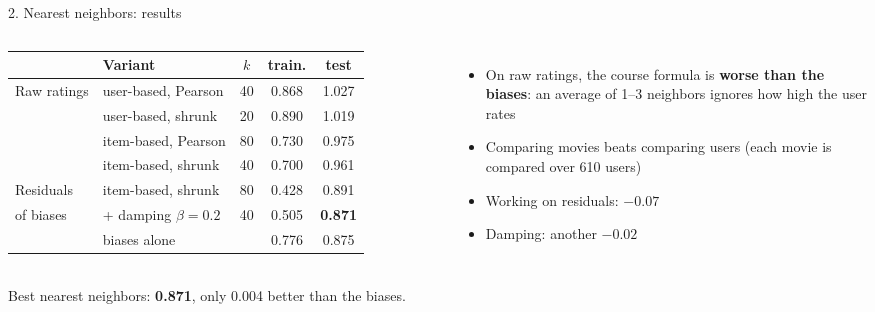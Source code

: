 \documentclass[aspectratio=169,11pt]{beamer}
\newcommand{\key}[1]{\textcolor{accent}{\textbf{#1}}}
\newcommand{\muted}[1]{\textcolor{soft}{#1}}
\newcommand{\takeaway}[1]{\vfill\begin{center}\colorbox{accent!8}{\parbox{0.9\textwidth}{\centering #1}}\end{center}}
\begin{document}
\begin{frame}{2. Nearest neighbors: results}
\begin{columns}[c]
\small
\begin{tabular}{@{}llccc@{}}
\toprule
 & \textbf{Variant} & $k$ & \textbf{train.} & \textbf{test} \\
\midrule
Raw ratings & user-based, Pearson & 40 & 0.868 & 1.027 \\
 & user-based, shrunk & 20 & 0.890 & 1.019 \\
 & item-based, Pearson & 80 & 0.730 & 0.975 \\
 & item-based, shrunk & 40 & 0.700 & 0.961 \\
\midrule
Residuals & item-based, shrunk & 80 & 0.428 & 0.891 \\
of biases & + damping $\beta = 0.2$ & 40 & 0.505 & \key{0.871} \\
\midrule
 & \muted{biases alone} & & \muted{0.776} & \muted{0.875} \\
\bottomrule
\end{tabular}
\begin{itemize}\small
  \item On raw ratings, the course formula is \key{worse than the biases}: an average of 1--3 neighbors ignores how high the user rates
  \item Comparing movies beats comparing users (each movie is compared over 610 users)
  \item Working on residuals: $-0.07$
  \item Damping: another $-0.02$
\end{itemize}
\end{columns}
\takeaway{Best nearest neighbors: \key{0.871}, only 0.004 better than the biases.}
\end{frame}
\end{document}
